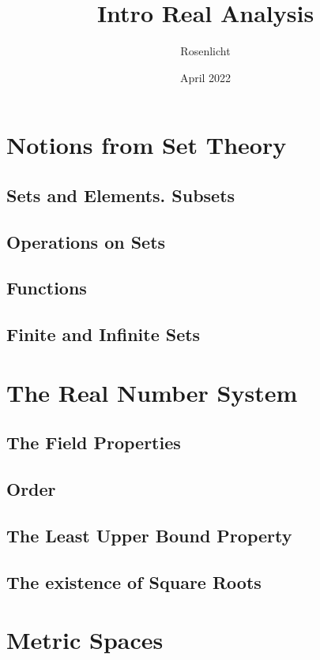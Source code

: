 \documentclass{article}
\title{Intro Real Analysis}
\author{Rosenlicht}
\date{April 2022}
\theoremstyle{definition}
\theoremstyle{theorem}
\begin{document}
	
	\maketitle
	\tableofcontents
	
	\section{Notions from Set Theory}
		\subsection{Sets and Elements. Subsets}
		
		\subsection{Operations on Sets}
		
		\subsection{Functions}
		
		\subsection{Finite and Infinite Sets}
	
	\section{The Real Number System}
		\subsection{The Field Properties}
		
		\subsection{Order}
		
		\subsection{The Least Upper Bound Property}
		
		\subsection{The existence of Square Roots}

	
	\section{Metric Spaces}
\end{document}
